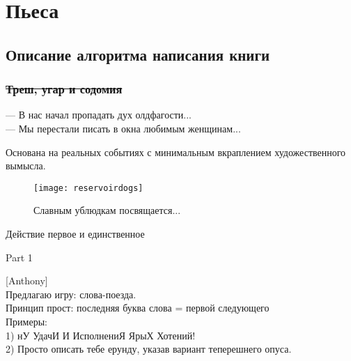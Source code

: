 \section*{Пьеса}
\subsection*{Описание алгоритма написания книги}
\subsubsection*{\sout{Треш, угар и содомия}} %
\begin{epigraph}
    --- В нас начал пропадать дух олдфагости...\\
    --- Мы перестали писать в окна любимым женщинам...
\end{epigraph}

Основана на реальных событиях с минимальным вкраплением художественного вымысла.\\ 

\begin{figure}[ht!]
    \centering
    \texttt{[image: reservoirdogs]}
    \caption{Славным ублюдкам посвящается...}
\end{figure}

\begin{center}
\Large Действие первое и единственное %
\end{center}


{\small{}}


{\small{}}

\begin{center}
\large Part 1
\end{center}


[Anthony]\\
Предлагаю игру: слова-поезда.\\
Принцип прост: последняя буква слова = первой следующего\\
Примеры:\\
1) нУ УдачИ И ИсполнениЯ ЯрыХ Хотений!\\
2) Просто описать тебе ерунду, указав вариант теперешнего опуса.


